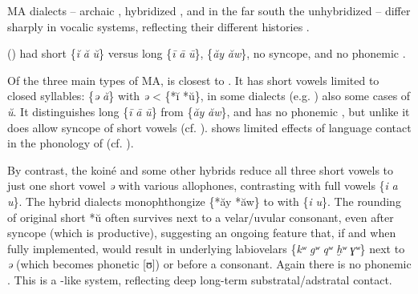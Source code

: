 \documentclass[output=paper]{langsci/langscibook}
\begin{document}
MA dialects – archaic , hybridized , and in the far south the unhybridized  – differ sharply in vocalic systems, reflecting their different histories \citep{Heath2018}.

  () had short \{\textit{ĭ} \textit{ă} \textit{ŭ}\} versus long \{\textit{ī} \textit{ā} \textit{ū}\},  \{\textit{ăy} \textit{ăw}\}, no syncope, and no phonemic . 

Of the three main types of MA,  is closest to . It has short vowels limited to closed syllables: \{\textit{ə} \textit{ă}\} with \textit{ə} < \{*ĭ *ŭ\}, in some dialects (e.g. ) also some cases of \textit{ŭ}. It distinguishes long \{\textit{ī} \textit{ā} \textit{ū}\} from  \{\textit{ăy} \textit{ăw}\}, and has no phonemic , but unlike  it does allow syncope of short vowels (cf. \citealt{Taine-Cheikh1988article}).  shows limited effects of language contact in the phonology of   (cf. \citealt{Taine-Cheikh1997Zenaga}).

By contrast, the koiné and some other hybrids reduce all three short vowels to just one short vowel \textit{ə} with various allophones, contrasting with full vowels \{\textit{i} \textit{a} \textit{u}\}. The hybrid dialects monophthongize \{*ăy *ăw\} to  with \{\textit{i} \textit{u}\}. The rounding of original short *ŭ often survives next to a velar/uvular consonant, even after syncope (which is productive), suggesting an ongoing feature  that, if and when fully implemented, would result in underlying labiovelars \{\textit{kʷ} \textit{gʷ} \textit{qʷ} \textit{ḫʷ} \textit{ɣʷ}\} next to \textit{ə} (which becomes phonetic [ʊ]) or before a consonant. Again there is no phonemic . This is a -like system, reflecting deep long-term substratal/adstratal contact.
\end{document}
